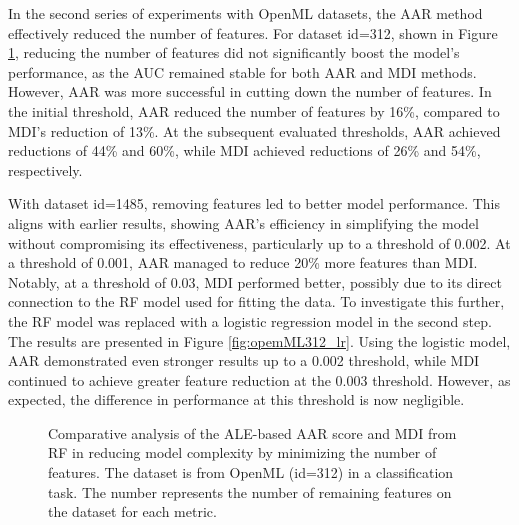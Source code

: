 

In the second series of experiments with OpenML datasets, the \gls{AAR} method effectively reduced the number of features. For dataset id=312, shown in Figure \ref{fig:opemML312}, reducing the number of features did not significantly boost the model's performance, as the \gls{AUC} remained stable for both \gls{AAR} and \gls{MDI} methods. However, \gls{AAR} was more successful in cutting down the number of features. In the initial threshold, \gls{AAR} reduced the number of features by 16\%, compared to \gls{MDI}'s reduction of 13\%. At the subsequent evaluated thresholds, \gls{AAR} achieved reductions of 44\% and 60\%, while \gls{MDI} achieved reductions of 26\% and 54\%, respectively.

With dataset id=1485, removing features led to better model performance. This aligns with earlier results, showing \gls{AAR}'s efficiency in simplifying the model without compromising its effectiveness, particularly up to a threshold of 0.002. At a threshold of 0.001, \gls{AAR} managed to reduce 20\% more features than \gls{MDI}. Notably, at a threshold of 0.03, \gls{MDI} performed better,  possibly due to its direct connection to the RF model used for fitting the data. To investigate this further, the RF model was replaced with a logistic regression model in the second step. The results are presented in Figure \ref{fig:opemML312_lr}. Using the logistic model, \gls{AAR} demonstrated even stronger results up to a 0.002 threshold, while \gls{MDI} continued to achieve greater feature reduction at the 0.003 threshold. However, as expected, the difference in performance at this threshold is now negligible.


\begin{figure}[ht!]
\centering
  \caption{Comparative analysis of the ALE-based AAR score and MDI from RF in reducing model complexity by minimizing the number of features. The dataset is from OpenML (id=312) in a classification task. The number represents the number of remaining features on the dataset for each metric. }
    \label{fig:opemML312}
\end{figure}


